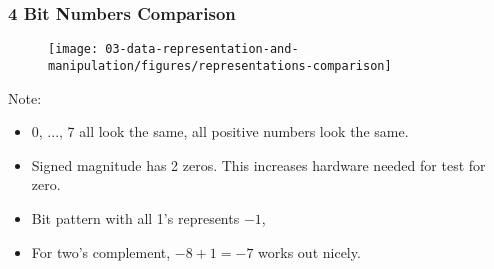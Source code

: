 \begin{frame}\frametitle{4 Bit Numbers Comparison}
\begin{figure}[H]
\centering
	{\texttt{[image: 03-data-representation-and-manipulation/figures/representations-comparison]}}
\end{figure}
Note:
\begin{itemize}
\item 0, ..., 7 all look the same, all positive numbers look the same. 
\item Signed magnitude has 2 zeros. This increases hardware needed for test for zero.
\item Bit pattern with all 1's represents $-1$,
\item For two's complement, $-8+1 =-7$ works out nicely.
\end{itemize}
\BNotes\ifnum{}
\fi\ENotes
\end{frame}

